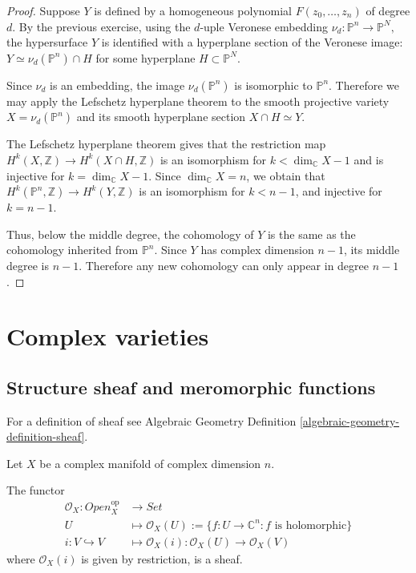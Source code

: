 \begin{proof}
Suppose $Y$ is defined by a homogeneous
polynomial
$
F(z_0,\dots,z_n)
$
of degree $d$. By the previous exercise,
using the $d$-uple Veronese embedding
$
\nu_d:\mathbb P^n\longrightarrow \mathbb P^N,
$
the hypersurface $Y$ is identified with a
hyperplane section of the Veronese image:
$
Y\simeq \nu_d(\mathbb P^n)\cap H
$
for some hyperplane $H\subset \mathbb P^N$.

Since $\nu_d$ is an embedding, the image
$\nu_d(\mathbb P^n)$ is isomorphic to
$\mathbb P^n$. Therefore we may apply the
Lefschetz hyperplane theorem to the smooth
projective variety
$
X=\nu_d(\mathbb P^n)
$
and its smooth hyperplane section
$
X\cap H\simeq Y.
$

The Lefschetz hyperplane theorem gives that
the restriction map
$
H^k(X,\mathbb Z)\longrightarrow
H^k(X\cap H,\mathbb Z)
$
is an isomorphism for
$
k<\dim_\mathbb C X-1
$
and is injective for
$
k=\dim_\mathbb C X-1.
$
Since $\dim_\mathbb C X=n$, we obtain that
$
H^k(\mathbb P^n,\mathbb Z)
\longrightarrow
H^k(Y,\mathbb Z)
$
is an isomorphism for $k<n-1$, and injective
for $k=n-1$.

Thus, below the middle degree, the cohomology
of $Y$ is the same as the cohomology inherited
from $\mathbb P^n$. Since $Y$ has complex
dimension $n-1$, its middle degree is $n-1$.
Therefore any new cohomology can only appear
in degree $n-1$.
\end{proof}

\section{Complex varieties}
\label{section-complex-varieties}

\subsection{Structure sheaf and meromorphic
functions}
\label{subsection-structure-sheaf-meromorphic}

For a definition of sheaf
see Algebraic Geometry Definition
\ref{algebraic-geometry-definition-sheaf}.

\begin{lemma}
\label{lemma-O_X-is-a-sheaf}
Let $X$ be a complex manifold of complex
dimension $n$.

The functor
$$
\begin{aligned}
\mathcal{O}_X: \mathit{Open}_X^{\text{op}}
&\longrightarrow \mathit{Set}
\\
U &\longmapsto \mathcal{O}_X(U):=\{f:U\to
\mathbb{C}^n:
f \text{ is holomorphic}\}\\
i:V \hookrightarrow V &\longmapsto
\mathcal{O}_X(i):\mathcal{O}_X(U) \to
\mathcal{O}_X(V)
\end{aligned}
$$
where $\mathcal{O}_X(i)$ is given by
restriction,
is a sheaf.
\end{lemma}

